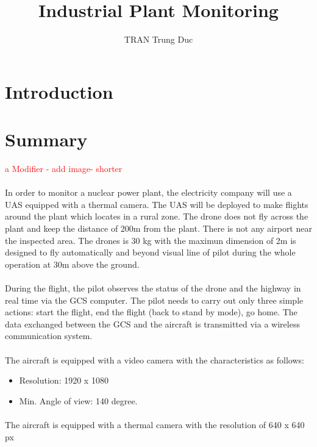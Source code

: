 \documentclass[]{article}
\title{Industrial Plant Monitoring}
\author{TRAN Trung Duc}
\begin{document}
	\maketitle
	\newpage
	\tableofcontents
	\newpage
	\section{Introduction}
	
	\section{Summary} \textcolor{red}{a Modifier - add image- shorter}
	\paragraph{}In order to monitor a nuclear power plant, the electricity company will use a UAS equipped with a thermal camera. The UAS will be deployed to make flights around the plant which locates in a rural zone. The drone does not fly across the plant and keep the distance of 200m from the plant. There is not any airport near the inspected area. The drones is 30 kg with the maximun dimension of 2m is designed to fly automatically and  beyond visual line of pilot during the whole operation at 30m above the ground. 
	
	\paragraph{}During the flight, the pilot observes the status of the drone and the highway in real time via the GCS computer. The pilot needs to carry out only three simple actions: start the flight, end the flight (back to stand by mode), go home. The data exchanged between the GCS and the aircraft is transmitted via a wireless communication system.
	
	\paragraph {} The aircraft is equipped with a video camera with the characteristics as follows:
	\begin{itemize}
		\item Resolution: 1920 x 1080
		\item Min. Angle of view: 140 degree. 	
	\end{itemize}

	\paragraph {} The aircraft is equipped with a thermal camera with the resolution of 640 x 640 px
	
\end{document}
